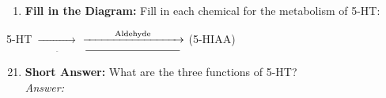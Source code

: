 \begin{enumerate}[label = \textbf{Q4.2.20}]
    \item \textbf{Fill in the Diagram:} Fill in each chemical for the metabolism of 5-HT: \\
\end{enumerate}
\vspace*{-0.5cm}
    5-HT \(\xrightarrow[\underline{\hspace{2cm}}]{}\) \underline{\hspace{4cm}} \(\xrightarrow[\text{\underline{\hspace{3cm}}}]{\text{Aldehyde}}\) \underline{\hspace{3cm}} (5-HIAA)

\begin{enumerate}[label = \textbf{Q4.2.\arabic*}]
    \setcounter{enumi}{20}
    \item \textbf{Short Answer:} What are the three functions of 5-HT? \\
          \textit{Answer:} \\ %
\end{enumerate}

\squigglyline
\newpage 
